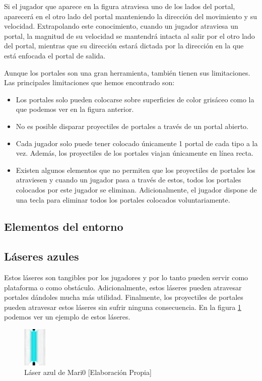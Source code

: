 Si el jugador que aparece en la figura atraviesa uno de los lados del portal, aparecerá en el otro lado del portal manteniendo la dirección del movimiento y su velocidad. Extrapolando este conocimiento, cuando un jugador atraviesa un portal, la magnitud de su velocidad se mantendrá intacta al salir por el otro lado del portal, mientras que su dirección estará dictada por la dirección en la que está enfocada el portal de salida.

Aunque los portales son una gran herramienta, también tienen sus limitaciones. Las principales limitaciones que hemos encontrado son:

\begin{itemize}
    \item Los portales solo pueden colocarse sobre superficies de color grisáceo como la que podemos ver en la figura anterior.
    \item No es posible disparar proyectiles de portales a través de un portal abierto.
    \item Cada jugador solo puede tener colocado únicamente 1 portal de cada tipo a la vez. Además, los proyectiles de los portales viajan únicamente en línea recta.
    \item Existen algunos elementos que no permiten que los proyectiles de portales los atraviesen y cuando un jugador pasa a través de estos, todos los portales colocados por este jugador se eliminan. Adicionalmente, el jugador dispone de una tecla para eliminar todos los portales colocados voluntariamente.
\end{itemize}


\subsection{Elementos del entorno}

\subsection*{Láseres azules}

Estos láseres son tangibles por los jugadores y por lo tanto pueden servir como plataforma o como obstáculo. Adicionalmente, estos láseres pueden atravesar portales dándoles mucha más utilidad. Finalmente, los proyectiles de portales pueden atravesar estos láseres sin sufrir ninguna consecuencia. En la figura \ref {fig:laser-azul} podemos ver un ejemplo de estos láseres.

\begin{figure}[h]
    \centering
    \includegraphics[width=0.1\textwidth]{img/laser-azul.png}
    \caption{Láser azul de Mari0 [Elaboración Propia]}
    \label{fig:laser-azul}
\end{figure}

